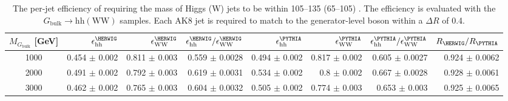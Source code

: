 \begin{table}
  \begin{center}
\caption{The per-jet efficiency of requiring the mass of Higgs (W) jets to 
be within 105--135 (65--105) \GeV. The efficiency is evaluated with the 
$G_\mathrm{bulk}\rightarrow \mathrm{hh} (\mathrm{WW})$ samples. Each AK8 jet is 
required to match to the generator-level boson within a $\Delta R$ of 0.4. }
  \begin{tabular}{c|rrrrrrr}
\hline\hline
$M_{G_\mathrm{bulk}}$ [GeV] &  $\epsilon_{\mathrm{hh}}^{\HERWIG}$ &  $\epsilon_{\mathrm{WW}}^{\HERWIG}$ & $\epsilon_{\mathrm{hh}}^{\HERWIG}/\epsilon_{\mathrm{WW}}^{\HERWIG}$ 
                                         &  $\epsilon_{\mathrm{hh}}^{\PYTHIA}$ &  $\epsilon_{\mathrm{WW}}^{\PYTHIA}$ &  $\epsilon_{\mathrm{hh}}^{\PYTHIA}/\epsilon_{\mathrm{WW}}^{\PYTHIA}$ &  $R_{\HERWIG}/R_{\PYTHIA}$ \\
\hline

1000 & 0.454 $\pm$ 0.002 & 0.811 $\pm$ 0.003 & 0.559 $\pm$ 0.0028 & 0.494 $\pm$ 0.002 & 0.817 $\pm$ 0.002 & 0.605 $\pm$ 0.0027 & 0.924 $\pm$ 0.0062 \\
2000 & 0.491 $\pm$ 0.002 & 0.792 $\pm$ 0.003 & 0.619 $\pm$ 0.0031 & 0.534 $\pm$ 0.002 & 0.8 $\pm$ 0.002 & 0.667 $\pm$ 0.0028 & 0.928 $\pm$ 0.0061 \\
3000 & 0.462 $\pm$ 0.002 & 0.765 $\pm$ 0.003 & 0.604 $\pm$ 0.0032 & 0.505 $\pm$ 0.002 & 0.774 $\pm$ 0.003 & 0.653 $\pm$ 0.003 & 0.925 $\pm$ 0.0065 \\
\hline
\hline
\end{tabular}
\label{tab:WideWindow}
\end{center}


\end{table}
